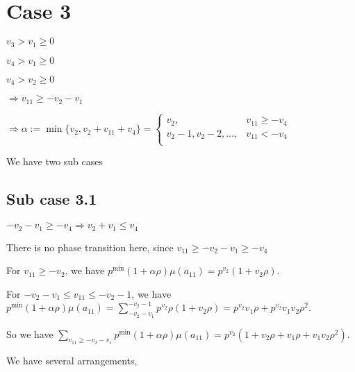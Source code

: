 \documentclass{article}
\begin{document}
\section{Case 3}
$v_3>v_1\geq{0}$

$v_4>v_1\geq{0}$

$v_4>v_2\geq{0}$

$\Rightarrow{v_{11}}\geq{-v_2-v_1}$

$\Rightarrow\alpha:=\min\{v_2,v_2+v_{11}+v_4\}=\begin{cases}
       v_2, & v_{11}\geq{-v_4}\\
       v_2-1,v_2-2,\dots, & v_{11}<{-v_4}\\
     \end{cases}$

We have two sub cases

\subsection{Sub case 3.1}
$-v_2-v_1\geq{-v_4}\Rightarrow{v_2+v_1\leq{v_4}}$

There is no phase transition here, since $v_{11}\geq{-v_2-v_1}\geq{-v_4}$

For $v_{11}\geq{-v_2}$, we have $p^{\min}(1+\alpha\rho)\mu(a_{11})=p^{v_2}(1+v_2\rho)$.

For $-v_2-v_1\leq{v_{11}}\leq{-v_2-1}$, we have $p^{\min}(1+\alpha\rho)\mu(a_{11})=\sum_{-v_2-v_1}^{-v_2-1}p^{v_2}\rho(1+v_2\rho)=p^{v_2}v_1\rho+p^{v_2}v_1v_2\rho^2$.

So we have $\sum_{v_{11}\geq{-v_2-v_1}}p^{\min}(1+\alpha\rho)\mu(a_{11})=p^{v_2}(1+v_2\rho+v_1\rho+v_1v_2\rho^2).$

We have several arrangements,
\end{document}
